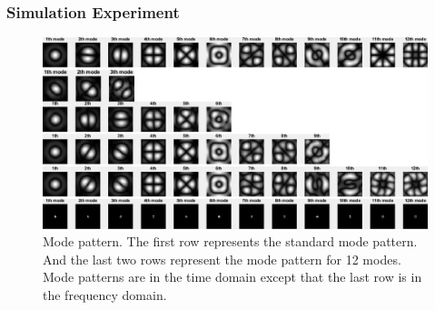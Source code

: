 \documentclass[UTF8]{beamer}
\begin{document}
\begin{frame}


\end{frame}

\begin{frame} \frametitle{Simulation Experiment}
\begin{figure}[H]
\centering
\includegraphics[width=1\linewidth]{../figures/modes_combine}
\caption{Mode pattern. The first row represents the standard mode pattern. And the last two rows represent the mode pattern for 12 modes. Mode patterns are in the time domain except that the last row is in the frequency domain.}
\label{fig:modescombine}
\end{figure}


\end{frame}
\end{document}
